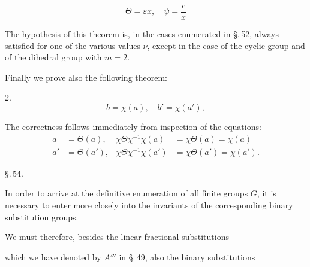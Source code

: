 \[
\Theta = \varepsilon x, \quad \psi = \frac{c}{x}
\]

The hypothesis of this theorem is, in the cases enumerated
in \S.\,52, always satisfied for one of the various values $\nu$,
except in the case of the cyclic group and of the
dihedral group with $m = 2$.

Finally we prove also the following theorem:

2.~
\[
b = \chi(a), \quad b' = \chi(a'),
\]

The correctness follows immediately from inspection
of the equations:
\[
\begin{aligned}
a &= \Theta(a), & \chi\Theta\chi^{-1}\chi(a) &= \chi\Theta(a) = \chi(a) \\
a' &= \Theta(a'), & \chi\Theta\chi^{-1}\chi(a') &= \chi\Theta(a') = \chi(a').
\end{aligned}
\]

\begin{center}
\S.\,54.

\end{center}

In order to arrive at the definitive enumeration of all finite groups
$G$, it is necessary to enter more closely into the invariants of the
corresponding binary substitution groups.

We must therefore, besides the linear fractional substitutions



which we have denoted by $A'''$ in \S.\,49, also the binary
substitutions

